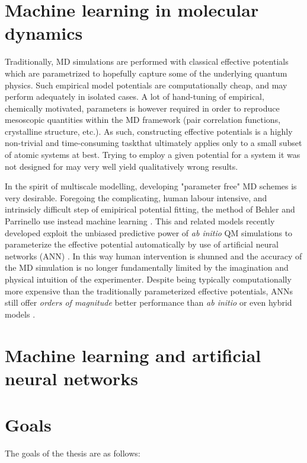 \documentclass[twoside,english]{uiofysmaster}
\begin{document}
\section{Machine learning in molecular dynamics}
Traditionally, MD simulations are performed with classical effective potentials which are parametrized to hopefully capture some of the underlying quantum physics. Such empirical model potentials are computationally cheap, and may perform adequately in isolated cases. A lot of hand-tuning of empirical, chemically motivated, parameters is however required in order to reproduce mesoscopic quantities within the MD framework (pair correlation functions, crystalline structure, etc.). As such, constructing effective potentials is a highly non-trivial and time-consuming task\textemdash that ultimately applies only to a small subset of atomic systems at best. Trying to employ a given potential for a 
system it was not designed for may very well yield qualitatively wrong results. 

In the spirit of multiscale modelling, developing "parameter free" MD schemes is very desirable. Foregoing the complicating, human labour intensive, and intrinsicly difficult step of emipirical potential fitting, the method of Behler and Parrinello use instead machine learning \cite{behlerparrinello}. This and related models recently developed exploit the unbiased predictive power of \emph{ab initio} QM simulations to parameterize the effective potential automatically by use of artificial neural networks (ANN) \cite{shen}. In this way human intervention is  shunned and the accuracy of the MD simulation is no longer fundamentally limited by the imagination and physical intuition of the experimenter. Despite being typically computationally more expensive than the traditionally parameterized effective potentials, ANNs still offer \emph{orders of magnitude} better performance than \emph{ab initio} or even hybrid models \cite{ratcliff,behler}.

\section{Machine learning and artificial neural networks}



\section{Goals}
The goals of the thesis are as follows:
\end{document}
